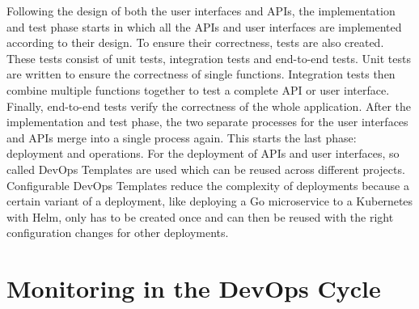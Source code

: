 Following the design of both the user interfaces and APIs,
the implementation and test phase starts in which all the APIs and user interfaces
are implemented according to their design. To ensure their correctness,
tests are also created. These tests consist of unit tests, integration tests and end-to-end tests.
Unit tests are written to ensure the correctness of single functions.
Integration tests then combine multiple functions together to test a complete API or user interface.
Finally, end-to-end tests verify the correctness of the whole application.
After the implementation and test phase, the two separate processes for the user interfaces
and APIs merge into a single process again. This starts the last phase: deployment and operations.
For the deployment of APIs and user interfaces, so called DevOps Templates are used
which can be reused across different projects. Configurable DevOps Templates reduce the complexity
of deployments because a certain variant of a deployment, like deploying a Go microservice
to a Kubernetes with Helm, only has to be created once and can then be reused with
the right configuration changes for other deployments.

\section{Monitoring in the DevOps Cycle}



